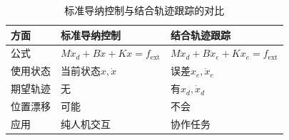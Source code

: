 \documentclass[12pt,a4paper]{article}
\begin{document}
\begin{table}[h]
\centering
\begin{tabular}{|l|l|l|}
\hline
\textbf{方面} & \textbf{标准导纳控制} & \textbf{结合轨迹跟踪} \\
\hline
公式 & $M\ddot{x}_d + B\dot{x} + Kx = f_{\text{ext}}$ & $M\ddot{x}_d + B\dot{x}_e + Kx_e = f_{\text{ext}}$ \\
\hline
使用状态 & 当前状态$x, \dot{x}$ & 误差$x_e, \dot{x}_e$ \\
\hline
期望轨迹 & 无 & 有$x_d, \dot{x}_d$ \\
\hline
位置漂移 & 可能 & 不会 \\
\hline
应用 & 纯人机交互 & 协作任务 \\
\hline
\end{tabular}
\caption{标准导纳控制与结合轨迹跟踪的对比}
\end{table}
\end{document}
